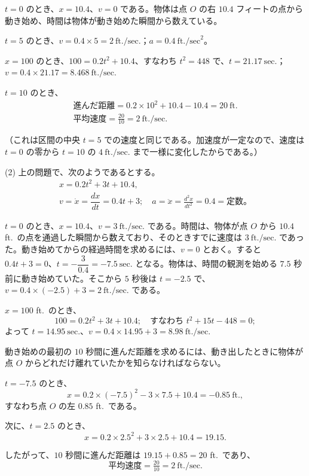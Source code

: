 \documentclass[a4paper,11pt,openany]{ltjsbook}
\begin{document}
$t = 0$ のとき、$x = 10.4$、$v = 0$ である。物体は点 $O$ の右 $10.4$ フィートの点から動き始め、時間は物体が動き始めた瞬間から数えている。

$t = 5$ のとき、$v = 0.4 \times 5 = 2~\text{ft./sec.}$；$a = 0.4~\text{ft./sec}^2$。

$x = 100$ のとき、$100 = 0.2t^2 + 10.4$、すなわち $t^2 = 448$ で、$t = 21.17~\text{sec.}$；$v = 0.4 \times 21.17 = 8.468~\text{ft./sec.}$

$t = 10$ のとき、
\begin{gather*}
\text{進んだ距離} = 0.2 \times 10^2 + 10.4 - 10.4 = 20~\text{ft.} \\
\text{平均速度} = \tfrac{20}{10} = 2~\text{ft./sec.}
\end{gather*}

（これは区間の中央 $t = 5$ での速度と同じである。加速度が一定なので、速度は $t = 0$ の零から $t = 10$ の $4~\text{ft./sec.}$ まで一様に変化したからである。）

(2) 上の問題で、次のようであるとする。
\begin{gather*}
x = 0.2t^2 + 3t + 10.4,\\
v = \dot{x} = \dfrac{dx}{dt} = 0.4t + 3;\quad a = \ddot{x} = \frac{d^2x}{dt^2} = 0.4 = \text{定数}。
\end{gather*}

$t = 0$ のとき、$x = 10.4$、$v = 3~\text{ft./sec.}$ である。時間は、物体が点 $O$ から $10.4$ ft.\ の点を通過した瞬間から数えており、そのときすでに速度は $3~\text{ft./sec.}$ であった。動き始めてからの経過時間を求めるには、$v = 0$ とおく。すると $0.4t + 3 = 0$、$t = -\dfrac{3}{0.4} = -7.5~\text{sec.}$ となる。物体は、時間の観測を始める $7.5$ 秒前に動き始めていた。そこから $5$ 秒後は $t = -2.5$ で、$v = 0.4 \times (-2.5) + 3 = 2~\text{ft./sec.}$ である。

$x = 100$ ft.\ のとき、
\[
100 = 0.2t^2 + 3t + 10.4;\quad \text{すなわち } t^2 + 15t - 448 = 0;
\]
よって $t = 14.95~\text{sec.}$、$v = 0.4 \times 14.95 + 3 = 8.98~\text{ft./sec.}$

動き始めの最初の $10$ 秒間に進んだ距離を求めるには、動き出したときに物体が点 $O$ からどれだけ離れていたかを知らなければならない。

$t = -7.5$ のとき、
\[
x = 0.2 \times (-7.5)^2 - 3 \times 7.5 + 10.4 = -0.85~\text{ft.},
\]
すなわち点 $O$ の左 $0.85$ ft.\ である。

次に、$t = 2.5$ のとき、
\[
x = 0.2 \times 2.5^2 + 3 \times 2.5 + 10.4 = 19.15.
\]

したがって、$10$ 秒間に進んだ距離は $19.15 + 0.85 = 20$ ft.\ であり、
\[
\text{平均速度} = \tfrac{20}{10} = 2~\text{ft./sec.}
\]
\end{document}
